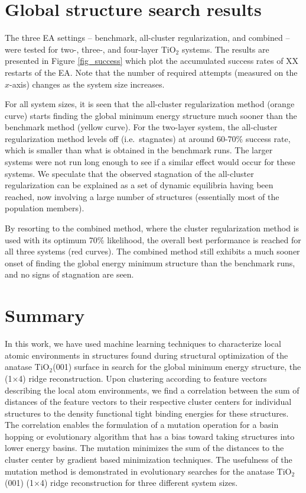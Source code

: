 \documentclass[aip,amsmath,amssymb,reprint]{revtex4-1}
\begin{document}
\section{Global structure search results}


The three EA settings -- benchmark, all-cluster regularization, and
combined -- were tested for two-, three-, and four-layer TiO$_2$
systems. The results are presented in Figure \ref{fig_success} which
plot the accumulated success rates of XX restarts of the EA. Note that
the number of required attempts (measured on the $x$-axis) changes as
the system size increases.

For all system sizes, it is seen that the all-cluster regularization
method (orange curve) starts finding the global minimum energy
structure much sooner than the benchmark method (yellow curve). For the two-layer system,
the all-cluster regularization method levels off (i.e.\ stagnates) at around 60-70\%
success rate, which is smaller than what is obtained in the benchmark
runs. The larger systems were not run long enough to see if a similar
effect would occur for these systems. We speculate that the observed
stagnation of the all-cluster regularization can be explained as a set
of dynamic equilibria having been reached, now involving a large
number of structures (essentially most of the population members).

By resorting to the combined method, where the cluster regularization
method is used with its optimum 70\% likelihood, the overall best
performance is reached for all three systems (red curves). The
combined method still exhibits a much sooner onset of finding the global energy
minimum structure than the benchmark runs, and no signs of stagnation are seen.


\section{Summary}
In this work, we have used machine learning techniques to characterize
local atomic environments in structures found during structural
optimization of the anatase TiO$_2$(001) surface in search for the
global minimum energy structure, the (1$\times$4) ridge
reconstruction. Upon clustering according to feature vectors
describing the local atom environments, we find a correlation between
the sum of distances of the feature vectors to their respective
cluster centers for individual structures to the density functional
tight binding energies for these structures. The correlation enables
the formulation of a mutation operation for a basin hopping or
evolutionary algorithm that has a bias toward taking structures
into lower energy basins. The mutation minimizes the sum of the
distances to the cluster center by gradient based minimization
techniques. The usefulness of the mutation method is demonstrated in
evolutionary searches for the anatase TiO$_2$(001) (1$\times$4) ridge
reconstruction for three different system sizes.
\end{document}
